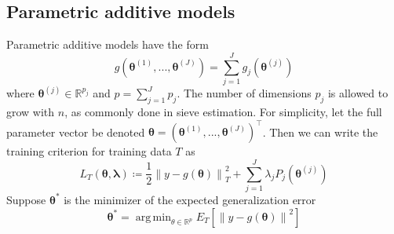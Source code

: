 \documentclass[12pt]{article}
\DeclareMathOperator*{\argmin}{arg\,min}
\begin{document}
\subsection{Parametric additive models}
\label{sec:param_add_models}
Parametric additive models have the form
\begin{equation}
g(\boldsymbol{\theta}^{(1)}, ..., \boldsymbol{\theta}^{(J)}) = \sum_{j=1}^J g_j(\boldsymbol{\theta}^{(j)})
\end{equation}
where $\boldsymbol{\theta}^{(j)} \in \mathbb{R}^{p_j}$ and $p = \sum_{j=1}^J p_j$. The number of dimensions $p_j$ is allowed to grow with $n$, as commonly done in sieve estimation. For simplicity, let the full parameter vector be denoted $\boldsymbol{\theta} = \left (\boldsymbol{\theta}^{(1)}, ..., \boldsymbol{\theta}^{(J)} \right )^\top$. Then we can write the training criterion for training data $T$ as
\begin{equation}
\label{eq:param_add}
L_T \left (\boldsymbol{\theta}, \boldsymbol{\lambda} \right) 
\coloneqq \frac{1}{2} \left  \| y -  g(\boldsymbol{\theta}) \right \|^2_T 
+ \sum_{j=1}^J \lambda_j P_j(\boldsymbol{\theta}^{(j)})
\end{equation}
Suppose $\boldsymbol{\theta}^*$ is the minimizer of the expected generalization error
\begin{equation}
\boldsymbol{\theta}^* = \argmin_{\theta \in \mathbb{R}^p} E_T \left [ \left \| y - g(\boldsymbol{\theta}) \right\|^2 \right ]
\end{equation}
\end{document}
